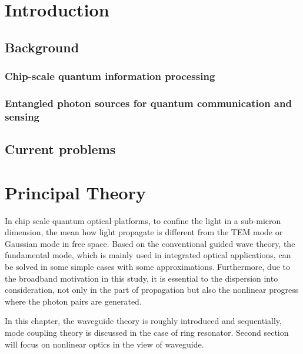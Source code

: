 \documentclass[final]{kuee_en}
\title{\cjk{窒化シリコン\\リング共振器を用いた\\広帯域周波数もつれ光子生成}}
\author{\cjk{殷　政浩}}
\date{\cjk{令和2年2月1日}}
\begin{document}
\maketitle

\begin{abstract}
    \lipsum[1]
\end{abstract}

\tableofcontents

\chapter{Introduction}
\lipsum[2-3]
\section{Background}
\subsection{Chip-scale quantum information processing}
\subsection{Entangled photon sources for quantum communication and sensing}
\section{Current problems}

\chapter{Principal Theory}

In chip scale quantum optical platforms, to confine the light in a sub-micron dimension, the mean how light propagate is different from the TEM mode or Gaussian mode in free space. Based on the conventional guided wave theory, the fundamental mode, which is mainly used in integrated optical applications, can be solved in some simple cases with some approximations. Furthermore, due to the broadband motivation in this study, it is essential to the dispersion into consideration, not only in the part of propagation but also the nonlinear progress where the photon pairs are generated.

In this chapter, the waveguide theory is roughly introduced and sequentially, mode coupling theory is discussed in the case of ring resonator. Second section will focus on nonlinear optics in the view of waveguide.
\end{document}
